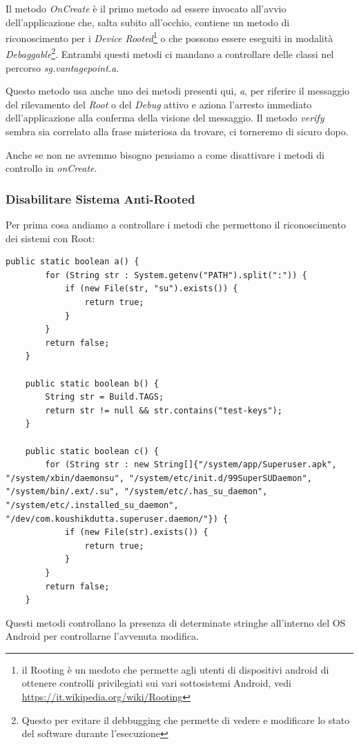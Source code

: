 \documentclass{article}
\begin{document}
Il metodo \emph{OnCreate} è il primo metodo ad essere invocato all'avvio dell'applicazione che, salta subito all'occhio, contiene un metodo di 
riconoscimento per i \emph{Device Rooted}\footnote{il Rooting è un medoto che permette agli utenti di dispositivi android di ottenere controlli privilegiati
 sui vari sottosistemi Android, vedi \url{https://it.wikipedia.org/wiki/Rooting}} o che possono essere eseguiti in modalità \emph{Debaggable}\footnote{
Questo per evitare il debbugging che permette di vedere e modificare lo stato del software durante l'esecuzione}. Entrambi questi metodi ci mandano a controllare 
delle classi nel percorso \textit{sg.vantagepoint.a}. 

Questo metodo usa anche uno dei metodi presenti qui, \emph{a}, per riferire il messaggio 
del rilevamento del \textit{Root} o del \textit{Debug} attivo e aziona l'arresto immediato dell'applicazione alla conferma della visione del messaggio.
Il metodo \textit{verify} sembra sia correlato alla frase misteriosa da trovare, ci torneremo di sicuro dopo.

Anche se non ne avremmo bisogno pensiamo a come disattivare i metodi di controllo in \emph{onCreate}.
\subsubsection{Disabilitare Sistema Anti-Rooted}
Per prima cosa andiamo a controllare i metodi che permettono il riconoscimento dei sistemi con Root:
\begin{lstlisting}[style=JavaStyle]
    public static boolean a() {
        for (String str : System.getenv("PATH").split(":")) {
            if (new File(str, "su").exists()) {
                return true;
            }
        }
        return false;
    }

    public static boolean b() {
        String str = Build.TAGS;
        return str != null && str.contains("test-keys");
    }

    public static boolean c() {
        for (String str : new String[]{"/system/app/Superuser.apk", "/system/xbin/daemonsu", "/system/etc/init.d/99SuperSUDaemon", "/system/bin/.ext/.su", "/system/etc/.has_su_daemon", "/system/etc/.installed_su_daemon", "/dev/com.koushikdutta.superuser.daemon/"}) {
            if (new File(str).exists()) {
                return true;
            }
        }
        return false;
    }
\end{lstlisting}

Questi metodi controllano la presenza di determinate stringhe all'interno del OS Android per controllarne l'avvenuta modifica.
\end{document}
